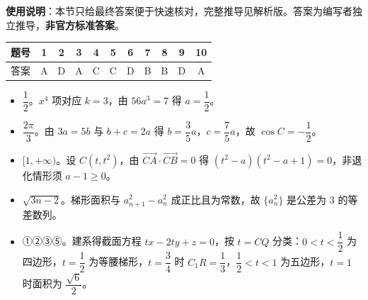 
\begin{gknotice}
\textbf{使用说明}：本节只给最终答案便于快速核对，完整推导见解析版。答案为编写者独立推导，\textbf{非官方标准答案}。
\end{gknotice}

\begin{center}\begin{tabular}{ccccccccccc}
\toprule
题号 & 1 & 2 & 3 & 4 & 5 & 6 & 7 & 8 & 9 & 10 \\
\midrule
答案 & A & D & A & C & C & D & B & B & D & A \\
\bottomrule
\end{tabular}\end{center}

\begin{itemize}[leftmargin=2.6em]
  \item[\textbf{11.}] $\dfrac12$。$x^4$ 项对应 $k=3$，由 $56a^3=7$ 得 $a=\dfrac12$。
  \item[\textbf{12.}] $\dfrac{2\pi}{3}$。由 $3a=5b$ 与 $b+c=2a$ 得 $b=\dfrac35a$，$c=\dfrac75a$，故 $\cos C=-\dfrac12$。
  \item[\textbf{13.}] $[1,+\infty)$。设 $C(t,t^2)$，由 $\overrightarrow{CA}\cdot\overrightarrow{CB}=0$ 得 $(t^2-a)(t^2-a+1)=0$，非退化情形须 $a-1\geqslant0$。
  \item[\textbf{14.}] $\sqrt{3n-2}$。梯形面积与 $a_{n+1}^2-a_n^2$ 成正比且为常数，故 $\{a_n^2\}$ 是公差为 $3$ 的等差数列。
  \item[\textbf{15.}] ①②③⑤。建系得截面方程 $tx-2ty+z=0$，按 $t=CQ$ 分类：$0<t<\dfrac12$ 为四边形，$t=\dfrac12$ 为等腰梯形，$t=\dfrac34$ 时 $C_1R=\dfrac13$，$\dfrac12<t<1$ 为五边形，$t=1$ 时面积为 $\dfrac{\sqrt6}{2}$。
\end{itemize}

